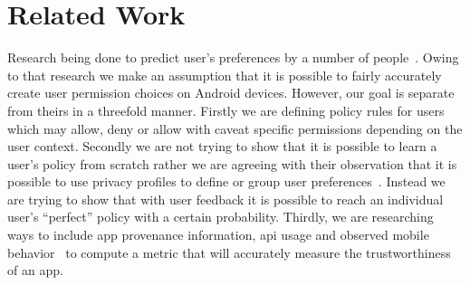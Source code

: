 \section{Related Work}
Research being done to predict user's preferences by a number of people~\cite{Benisch2011,Sadeh2009,lin2014soups,liu2014www}. Owing to that research we make an assumption that it is possible to fairly accurately create user permission choices on Android devices. However, our goal is separate from theirs in a threefold manner. Firstly we are defining policy rules for users which may allow, deny or allow with caveat specific permissions depending on the user context. Secondly we are not trying to show that it is possible to learn a user's policy from scratch rather we are agreeing with their observation that it is possible to use privacy profiles to define or group user preferences~\cite{liu2014www}. Instead we are trying to show that with user feedback it is possible to reach an individual user's ``perfect'' policy with a certain probability. Thirdly, we are researching ways to include app provenance information, api usage and observed mobile behavior~\cite{enck2010taintdroid} to compute a metric that will accurately measure the trustworthiness of an app.